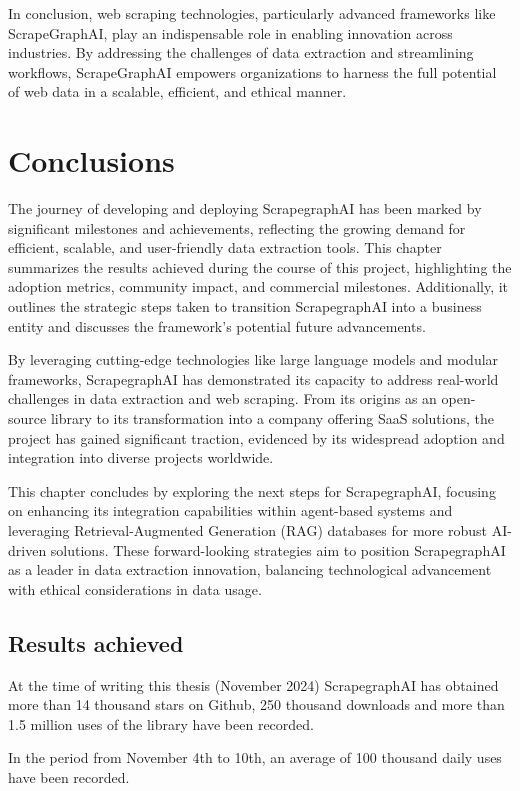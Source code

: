 In conclusion, web scraping technologies, particularly advanced frameworks like ScrapeGraphAI, play an indispensable role in enabling innovation across industries. By addressing the challenges of data extraction and streamlining workflows, ScrapeGraphAI empowers organizations to harness the full potential of web data in a scalable, efficient, and ethical manner.


\chapter{Conclusions}
The journey of developing and deploying ScrapegraphAI has been marked by significant milestones and achievements, reflecting the growing demand for efficient, scalable, and user-friendly data extraction tools. This chapter summarizes the results achieved during the course of this project, highlighting the adoption metrics, community impact, and commercial milestones. Additionally, it outlines the strategic steps taken to transition ScrapegraphAI into a business entity and discusses the framework's potential future advancements.

By leveraging cutting-edge technologies like large language models and modular frameworks, ScrapegraphAI has demonstrated its capacity to address real-world challenges in data extraction and web scraping. From its origins as an open-source library to its transformation into a company offering SaaS solutions, the project has gained significant traction, evidenced by its widespread adoption and integration into diverse projects worldwide.

This chapter concludes by exploring the next steps for ScrapegraphAI, focusing on enhancing its integration capabilities within agent-based systems and leveraging Retrieval-Augmented Generation (RAG) databases for more robust AI-driven solutions. These forward-looking strategies aim to position ScrapegraphAI as a leader in data extraction innovation, balancing technological advancement with ethical considerations in data usage.
\section{Results achieved}
At the time of writing this thesis (November 2024) ScrapegraphAI  has obtained more than 14 thousand stars on Github, 250 thousand downloads and more than 1.5 million uses of the library have been recorded. 

In the period from November 4th to 10th, an average of 100 thousand daily uses have been recorded.

